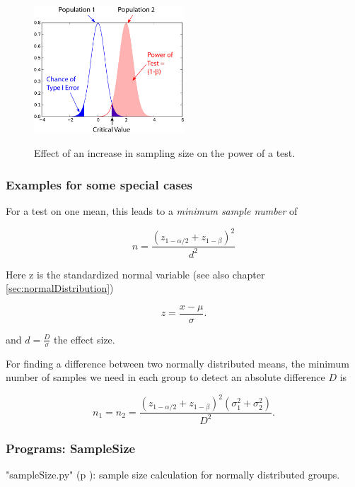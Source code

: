 \begin{figure}[!ht]
  \centering
  \includegraphics[width=0.5\textwidth]{../Images/power2.png}\\
  \caption{Effect of an increase in sampling size on the power of a test.}\label{fig:power2}
\end{figure}

\subsubsection{Examples for some special cases}

For a test on one mean, this leads to a \emph{minimum sample number} of

\begin{equation}
  n = \frac{{({z_{1 - \alpha /2}} + {z_{1 - \beta }})}^2}{d^2}
\end{equation}

Here z is the standardized normal variable (see also chapter \ref{sec:normalDistribution})

\begin{equation}
  z = \frac{x-\mu}{\sigma} .
\end{equation}

and $d = \frac{D}{\sigma}$ the effect size.

For finding a difference between two normally distributed means, the minimum number of samples we need in each group to detect an absolute difference $D$ is

\begin{equation}
  {n_1} = {n_2} = \frac{{({z_{1 - \alpha /2}} + {z_{1 - \beta }})}^2(\sigma _1^2 + \sigma _2^2)}{D^2} .
\end{equation}

\subsubsection{Programs: SampleSize}

\PyImg "sampleSize.py" (p \pageref{py:sampleSize}): sample size calculation for normally distributed groups.


